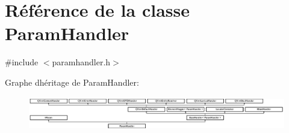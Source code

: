 \hypertarget{class_param_handler}{}\section{Référence de la classe Param\+Handler}
\label{class_param_handler}


{\ttfamily \#include $<$paramhandler.\+h$>$}

Graphe d\textquotesingle{}héritage de Param\+Handler\+:\begin{figure}[H]
\begin{center}
\leavevmode
\includegraphics[height=1.502347cm]{class_param_handler}
\end{center}
\end{figure}
